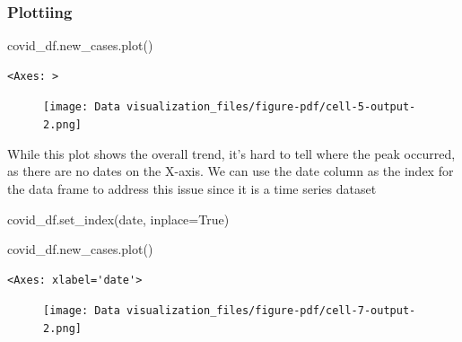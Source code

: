 \documentclass[
  letterpaper,
  DIV=11,
  numbers=noendperiod]{scrreprt}
\newenvironment{Shaded}{\begin{snugshade}}{\end{snugshade}}
\newcommand{\NormalTok}[1]{\textcolor[rgb]{0.00,0.23,0.31}{#1}}
\newcommand{\OperatorTok}[1]{\textcolor[rgb]{0.37,0.37,0.37}{#1}}
\newcommand{\StringTok}[1]{\textcolor[rgb]{0.13,0.47,0.30}{#1}}
\newcommand{\VariableTok}[1]{\textcolor[rgb]{0.07,0.07,0.07}{#1}}
\begin{document}
\hypertarget{plottiing}{%
\subsubsection{Plottiing}\label{plottiing}}

\begin{Shaded}
\begin{Highlighting}[]
\NormalTok{covid\_df.new\_cases.plot()}
\end{Highlighting}
\end{Shaded}

\begin{verbatim}
<Axes: >
\end{verbatim}

\begin{figure}[H]

{\centering \texttt{[image: Data visualization\_files/figure-pdf/cell-5-output-2.png]}

}

\end{figure}

While this plot shows the overall trend, it's hard to tell where the
peak occurred, as there are no dates on the X-axis. We can use the date
column as the index for the data frame to address this issue since it is
a time series dataset

\begin{Shaded}
\begin{Highlighting}[]
\NormalTok{covid\_df.set\_index(}\StringTok{\textquotesingle{}date\textquotesingle{}}\NormalTok{, inplace}\OperatorTok{=}\VariableTok{True}\NormalTok{)}
\end{Highlighting}
\end{Shaded}

\begin{Shaded}
\begin{Highlighting}[]
\NormalTok{covid\_df.new\_cases.plot()}
\end{Highlighting}
\end{Shaded}

\begin{verbatim}
<Axes: xlabel='date'>
\end{verbatim}

\begin{figure}[H]

{\centering \texttt{[image: Data visualization\_files/figure-pdf/cell-7-output-2.png]}

}

\end{figure}
\end{document}
